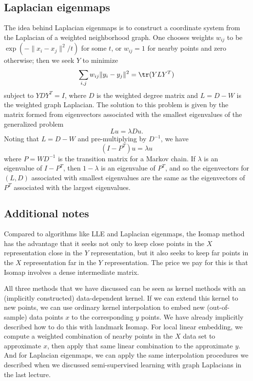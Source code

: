 \documentclass[12pt, leqno]{article} %
\begin{document}
{\subsection{Laplacian eigenmaps}

The idea behind Laplacian eigenmaps is to construct a coordinate
system from the Laplacian of a weighted neighborhood graph.  One
chooses weights $w_{ij}$ to be $\exp(-\|x_i-x_j\|^2/t)$ for some $t$,
or $w_{ij} = 1$ for nearby points and zero otherwise; then we seek
$Y$ to minimize
\[
  \sum_{i,j} w_{ij} \|y_i-y_j\|^2 = \tr(Y L Y^T)
\]
subject to $Y D Y^T = I$, where $D$ is the weighted degree matrix and
$L = D-W$ is the weighted graph Laplacian.  The solution to this
problem is given by the matrix formed from eigenvectors associated
with the smallest eigenvalues of the generalized problem
\[
  L u = \lambda D u.
\]
Noting that $L = D-W$ and pre-multiplying by $D^{-1}$, we have
\[
 (I-P^T) u = \lambda u
\]
where $P = WD^{-1}$ is the transition matrix for a Markov chain.
If $\lambda$ is an eigenvalue of $I-P^T$, then $1-\lambda$ is an
eigenvalue of $P^T$, and so the eigenvectors for $(L, D)$ associated
with smallest eigenvalues are the same as the eigenvectors of $P^T$
associated with the largest eigenvalues.

\subsection{Additional notes}

Compared to algorithms like LLE and Laplacian eigenmaps, the Isomap
method has the advantage that it seeks not only to keep close points
in the $X$ representation close in the $Y$ representation, but it
also seeks to keep far points in the $X$ representation far in the $Y$
representation.  The price we pay for this is that Isomap involves a
dense intermediate matrix.

All three methods that we have discussed can be seen as kernel methods
with an (implicitly constructed) data-dependent kernel.  If we can
extend this kernel to new points, we can use ordinary kernel
interpolation to embed new (out-of-sample) data points $x$ to the
corresponding $y$ points.  We have already implicitly described how to
do this with landmark Isomap.  For local linear embedding, we compute
a weighted combination of nearby points in the $X$ data set to
approximate $x$, then apply that same linear combination to the
approximate $y$.  And for Laplacian eigenmaps, we can apply the same
interpolation procedures we described when we discussed
semi-supervised learning with graph Laplacians in the last lecture.

}
\end{document}
